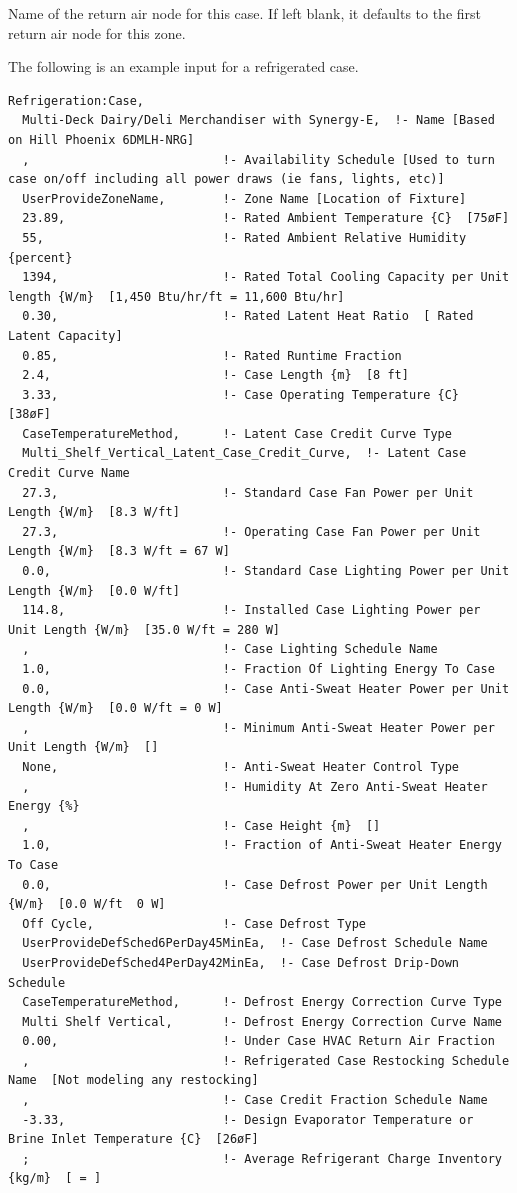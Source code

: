 Name of the return air node for this case. If left blank, it defaults to the first return air node for this zone.

The following is an example input for a refrigerated case.

\begin{lstlisting}
Refrigeration:Case,
  Multi-Deck Dairy/Deli Merchandiser with Synergy-E,  !- Name [Based on Hill Phoenix 6DMLH-NRG]
  ,                           !- Availability Schedule [Used to turn case on/off including all power draws (ie fans, lights, etc)]
  UserProvideZoneName,        !- Zone Name [Location of Fixture]
  23.89,                      !- Rated Ambient Temperature {C}  [75øF]
  55,                         !- Rated Ambient Relative Humidity {percent}
  1394,                       !- Rated Total Cooling Capacity per Unit length {W/m}  [1,450 Btu/hr/ft = 11,600 Btu/hr]
  0.30,                       !- Rated Latent Heat Ratio  [ Rated Latent Capacity]
  0.85,                       !- Rated Runtime Fraction
  2.4,                        !- Case Length {m}  [8 ft]
  3.33,                       !- Case Operating Temperature {C}  [38øF]
  CaseTemperatureMethod,      !- Latent Case Credit Curve Type
  Multi_Shelf_Vertical_Latent_Case_Credit_Curve,  !- Latent Case Credit Curve Name
  27.3,                       !- Standard Case Fan Power per Unit Length {W/m}  [8.3 W/ft]
  27.3,                       !- Operating Case Fan Power per Unit Length {W/m}  [8.3 W/ft = 67 W]
  0.0,                        !- Standard Case Lighting Power per Unit Length {W/m}  [0.0 W/ft]
  114.8,                      !- Installed Case Lighting Power per Unit Length {W/m}  [35.0 W/ft = 280 W]
  ,                           !- Case Lighting Schedule Name
  1.0,                        !- Fraction Of Lighting Energy To Case
  0.0,                        !- Case Anti-Sweat Heater Power per Unit Length {W/m}  [0.0 W/ft = 0 W]
  ,                           !- Minimum Anti-Sweat Heater Power per Unit Length {W/m}  []
  None,                       !- Anti-Sweat Heater Control Type
  ,                           !- Humidity At Zero Anti-Sweat Heater Energy {%}
  ,                           !- Case Height {m}  []
  1.0,                        !- Fraction of Anti-Sweat Heater Energy To Case
  0.0,                        !- Case Defrost Power per Unit Length {W/m}  [0.0 W/ft  0 W]
  Off Cycle,                  !- Case Defrost Type
  UserProvideDefSched6PerDay45MinEa,  !- Case Defrost Schedule Name
  UserProvideDefSched4PerDay42MinEa,  !- Case Defrost Drip-Down Schedule
  CaseTemperatureMethod,      !- Defrost Energy Correction Curve Type
  Multi Shelf Vertical,       !- Defrost Energy Correction Curve Name
  0.00,                       !- Under Case HVAC Return Air Fraction
  ,                           !- Refrigerated Case Restocking Schedule Name  [Not modeling any restocking]
  ,                           !- Case Credit Fraction Schedule Name
  -3.33,                      !- Design Evaporator Temperature or Brine Inlet Temperature {C}  [26øF]
  ;                           !- Average Refrigerant Charge Inventory {kg/m}  [ = ]
\end{lstlisting}

